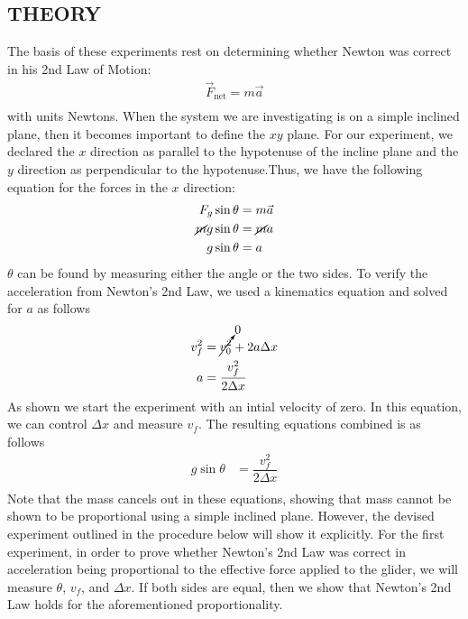 \documentclass [12pt, letterpaper, twoside] {article}
\begin{document}
\subsection* {THEORY}
\noindent
The basis of these experiments rest on determining whether Newton was correct in his 2nd Law of Motion:
\begin {equation}
  \begin {split}
    \vec{F}_{\text{net}} = m\vec{a} \\
  \end {split}
\end {equation}
with units Newtons. When the system we are investigating is on a simple inclined plane, then it becomes important to define the \(xy\) plane. For our experiment, we declared the \(x\) direction as parallel to the hypotenuse of the incline plane and the \(y\) direction as perpendicular to the hypotenuse.Thus, we have the following equation for the forces in the \(x\) direction:
\begin {equation}
  \begin {split}
    F_{g}\sin{\theta} & = m\vec{a} \\
    \cancel{m}{}g\sin{\theta} & = \cancel{m}{}a \\
    g\sin{\theta} & = a \\
  \end {split}
\end {equation}
\(\theta\) can be found by measuring either the angle or the two sides. To verify the acceleration from Newton's 2nd Law, we used a kinematics equation and solved for \(a\) as follows
\begin {equation}
  \begin {split}
    v_{f}^2 & = \cancelto{0}{v_{0}^2}+2a\Delta{x} \\
    a & = \dfrac{v_{f}^2}{2\Delta{x}} \\
  \end {split}
\end {equation}
As shown we start the experiment with an intial velocity of zero. In this equation, we can control \(\Delta{x}\) and measure \(v_{f}\). The resulting equations combined is as follows
\begin {equation}
  \begin {split}
     g\sin{\theta} & = \dfrac{v_{f}^2}{2\Delta{x}} \\
  \end {split}
\end {equation}
Note that the mass cancels out in these equations, showing that mass cannot be shown to be proportional using a simple inclined plane. However, the devised experiment outlined in the procedure below will show it explicitly. For the first experiment, in order to prove whether Newton's 2nd Law was correct in acceleration being proportional to the effective force applied to the glider, we will measure \(\theta\), \(v_{f}\), and \(\Delta{x}\). If both sides are equal, then we show that Newton's 2nd Law holds for the aforementioned proportionality. 
\end{document}
